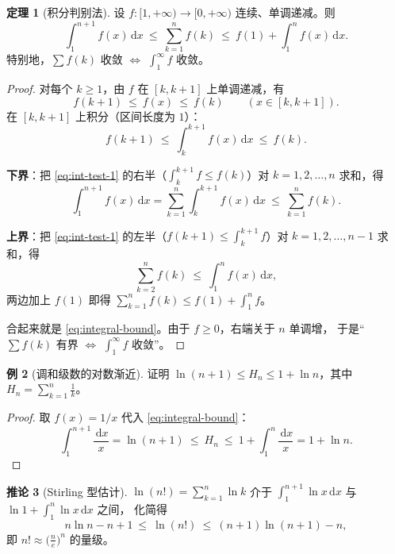 \documentclass[11pt,a4paper]{ctexart}
\theoremstyle{definition}
\newtheorem{theorem}{定理}[section]
\newtheorem{corollary}[theorem]{推论}
\newtheorem{example}[theorem]{例}
\theoremstyle{remark}
\newcommand{\dd}{\,\mathrm{d}}
\begin{document}
\begin{theorem}[积分判别法]\label{thm:integral-test}
设 $f:[1,+\infty)\to[0,+\infty)$ 连续、单调递减。则
\begin{equation}\label{eq:integral-bound}
  \int_1^{n+1}f(x)\dd x\ \le\ \sum_{k=1}^{n}f(k)\ \le\ f(1)+\int_1^{n}f(x)\dd x .
\end{equation}
特别地，$\sum f(k)$ 收敛 $\iff$ $\int_1^\infty f$ 收敛。
\end{theorem}

\begin{proof}
对每个 $k\ge1$，由 $f$ 在 $[k,k+1]$ 上单调递减，有
\[
  f(k+1)\ \le\ f(x)\ \le\ f(k)\qquad(x\in[k,k+1]).
\]
在 $[k,k+1]$ 上积分（区间长度为 $1$）：
\begin{equation}\label{eq:int-test-1}
  f(k+1)\ \le\ \int_k^{k+1}f(x)\dd x\ \le\ f(k).
\end{equation}

\textbf{下界}：把 \eqref{eq:int-test-1} 的右半（$\int_k^{k+1}f\le f(k)$）对
$k=1,2,\dots,n$ 求和，得
\[
  \int_1^{n+1}f(x)\dd x=\sum_{k=1}^{n}\int_k^{k+1}f(x)\dd x
  \ \le\ \sum_{k=1}^{n}f(k).
\]

\textbf{上界}：把 \eqref{eq:int-test-1} 的左半（$f(k+1)\le\int_k^{k+1}f$）对
$k=1,2,\dots,n-1$ 求和，得
\[
  \sum_{k=2}^{n}f(k)\ \le\ \int_1^{n}f(x)\dd x,
\]
两边加上 $f(1)$ 即得 $\displaystyle\sum_{k=1}^{n}f(k)\le f(1)+\int_1^{n}f$。

合起来就是 \eqref{eq:integral-bound}。由于 $f\ge0$，右端关于 $n$ 单调增，
于是“$\sum f(k)$ 有界 $\iff$ $\int_1^\infty f$ 收敛”。
\end{proof}

\begin{example}[调和级数的对数渐近]\label{ex:harmonic}
证明 $\ln(n+1)\le H_n\le 1+\ln n$，其中 $H_n=\sum_{k=1}^{n}\frac1k$。
\end{example}

\begin{proof}
取 $f(x)=1/x$ 代入 \eqref{eq:integral-bound}：
\[
  \int_1^{n+1}\frac{\dd x}{x}=\ln(n+1)\ \le\ H_n\ \le\ 1+\int_1^{n}\frac{\dd x}{x}=1+\ln n .
\]
\end{proof}

\begin{corollary}[Stirling 型估计]
$\ln(n!)=\sum_{k=1}^{n}\ln k$ 介于
$\int_1^{n+1}\ln x\dd x$ 与 $\ln 1+\int_1^n\ln x\dd x$ 之间，
化简得
\[
  n\ln n-n+1\ \le\ \ln(n!)\ \le\ (n+1)\ln(n+1)-n ,
\]
即 $n!\approx\big(\frac ne\big)^n$ 的量级。
\end{corollary}
\end{document}
